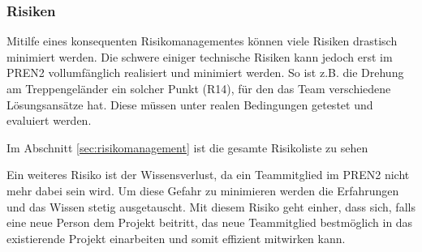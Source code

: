 \subsubsection{Risiken}
Mitilfe eines konsequenten Risikomanagementes können viele Risiken drastisch minimiert werden. Die schwere einiger technische Risiken kann jedoch erst im PREN2 vollumfänglich realisiert und minimiert werden. So ist z.B. die Drehung am Treppengeländer ein solcher Punkt (R14), für den das Team verschiedene Lösungsansätze hat. Diese müssen unter realen Bedingungen getestet und evaluiert werden.

Im Abschnitt \ref{sec:risikomanagement} ist die gesamte Risikoliste zu sehen

Ein weiteres Risiko ist der Wissensverlust, da ein Teammitglied im PREN2 nicht mehr dabei sein wird. Um diese Gefahr zu minimieren werden die Erfahrungen und das Wissen stetig ausgetauscht. Mit diesem Risiko geht einher, dass sich, falls eine neue Person dem Projekt beitritt, das neue Teammitglied bestmöglich in das existierende Projekt einarbeiten und somit effizient mitwirken kann.












